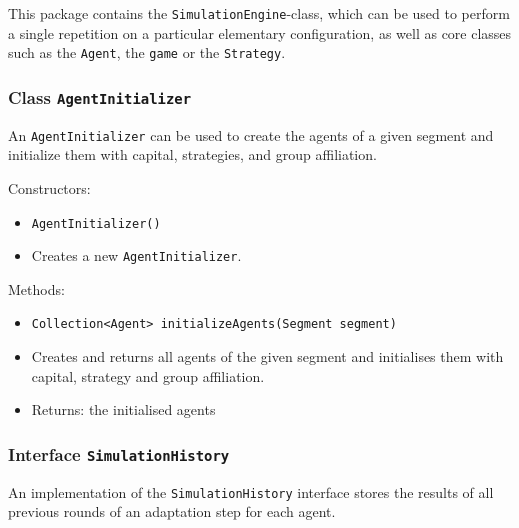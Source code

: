 \documentclass[parskip=full,11pt]{scrartcl}
\begin{document}
This package contains the \texttt{SimulationEngine}-class, which can be used to perform a single repetition on a particular elementary configuration, as well as core classes such as the \texttt{Agent}, the \texttt{game} or the \texttt{Strategy}.

\subsubsection{Class \texttt{AgentInitializer}}
An \texttt{AgentInitializer} can be used to create the agents of a given segment and initialize them with capital, strategies, and group affiliation.

Constructors:
\begin{itemize}\itemsep -10pt
\item \texttt{AgentInitializer()}
\item[] Creates a new \texttt{AgentInitializer}.
\end{itemize}

Methods:
\begin{itemize}\itemsep -10pt
\item \texttt{Collection<Agent> initializeAgents(Segment segment)}
\item[] Creates and returns all agents of the given segment and initialises them with capital, strategy and group affiliation.
\item[] Returns: the initialised agents
\end{itemize}

\subsubsection{Interface \texttt{SimulationHistory}}
An implementation of the \texttt{SimulationHistory} interface stores the results of all previous rounds of an adaptation step for each agent.
\end{document}
